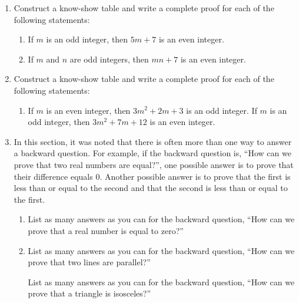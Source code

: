 \begin{enumerate}

\item Construct a know-show table and write a complete proof for each of the following statements:

\begin{enumerate}
\yitem If $m$ is an even integer, then $5m + 7$ is an odd integer.

\item If $m$ is an odd integer, then $5m + 7$ is an even integer.

\item If $m$ and $n$ are odd integers, then $mn + 7$ is an even integer.
\end{enumerate}\label{exer:5m+7}%

\item \label{exer:3m2}%
Construct a know-show table and write a complete proof for each of the following statements: 

\begin{enumerate}
\item If $m$ is an even integer, then $3m^2 + 2m + 3$ is an odd integer.
\yitem If $m$ is an odd integer, then $3m^2 + 7m + 12$ is an even integer.
\end{enumerate}

\item \label{exer:sec12-7}%
In this section, it was noted that there is often more than one way to answer a backward question.  For example, if the backward question is, ``How can we prove that two real numbers are equal?'', one possible answer is to prove that their difference equals 0.  Another possible answer is to prove that the first is less than or equal to the second and that the second is less than or equal to the first. 

  \begin{enumerate}
    \yitem Give at least one more answer to the backward question, ``How can we prove that two real numbers are equal?''
    \item List as many answers as you can for the backward question, ``How can we prove that a real number is equal to zero?''
    \item List as many answers as you can for the backward question, ``How can we prove that two lines are parallel?''

    \yitem List as many answers as you can for the backward question, ``How can we prove that a triangle is isosceles?''


\end{enumerate}
\end{enumerate}
